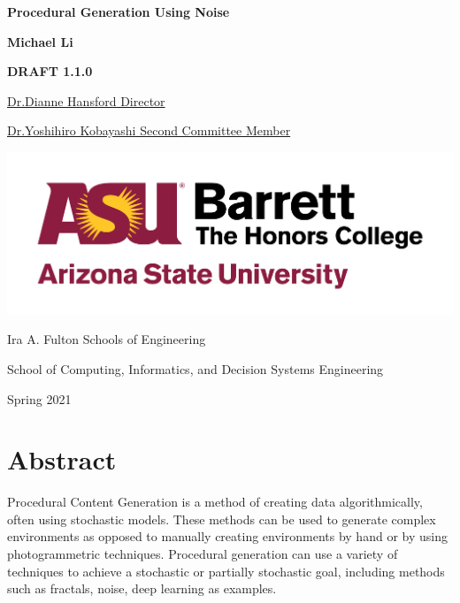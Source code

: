 \documentclass[10pt]{report}
\begin{document}
	\begin{titlepage}
		\begin{center}
			\Large
			\textbf{Procedural Generation Using Noise}
			
			\vspace{1.5cm}
			\normalsize
			\textbf{Michael Li}
			
			\vfill
			
			\textbf{DRAFT 1.1.0}
			
			\uline{Dr.Dianne Hansford \hfill Director}
			\vspace{1.5cm}
			
			\uline{Dr.Yoshihiro Kobayashi \hfill Second Committee Member}
			
			\vspace{3cm}
			
			\includegraphics[scale=.5]{asu_barretthonors_horiz_rgb_maroongold_600ppi}
			
			\vspace{1.5cm}
			Ira A. Fulton Schools of Engineering
			
			School of Computing, Informatics, and Decision Systems Engineering
			
			Spring 2021
			
		\end{center}
	\end{titlepage}
	
	\chapter*{Abstract}
	
	Procedural Content Generation is a method of creating data algorithmically, often using stochastic models. These methods can be used to generate complex environments as opposed to manually creating environments by hand or by using photogrammetric techniques. Procedural generation can use a variety of techniques to achieve a stochastic or partially stochastic goal, including methods such as fractals,  noise, deep learning as examples.
	
\end{document}

